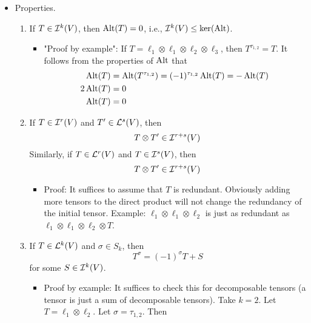 \documentclass[../notes.tex]{subfiles}
\begin{document}
\begin{itemize}
\begin{itemize}
    \end{itemize}
    \item Properties.
    \begin{enumerate}
        \item If $T\in\ide[k]{V}$, then $\Alt(T)=0$, i.e., $\ide[k]{V}\leq\ker(\Alt)$.
        \begin{itemize}
            \item "Proof by example": If $T=\ell_1\otimes\ell_1\otimes\ell_2\otimes\ell_3$, then $T^{\tau_{1,2}}=T$. It follows from the properties of $\Alt$ that
            \begin{align*}
                \Alt(T) &= \Alt(T^{\tau_{1,2}})
                = (-1)^{\tau_{1,2}}\Alt(T)
                = -\Alt(T)\\
                2\Alt(T) &= 0\\
                \Alt(T) &= 0
            \end{align*}
        \end{itemize}
        \item If $T\in\ide[r]{V}$ and $T'\in\lin[s]{V}$, then
        \begin{equation*}
            T\otimes T'\in\ide[r+s]{V}
        \end{equation*}
        Similarly, if $T\in\lin[r]{V}$ and $T\in\ide[s]{V}$, then
        \begin{equation*}
            T\otimes T'\in\ide[r+s]{V}
        \end{equation*}
        \begin{itemize}
            \item Proof: It suffices to assume that $T$ is redundant. Obviously adding more tensors to the direct product will not change the redundancy of the initial tensor. Example: $\ell_1\otimes\ell_1\otimes\ell_2$ is just as redundant as $\ell_1\otimes\ell_1\otimes\ell_2\otimes T$.
        \end{itemize}
        \item If $T\in\lin[k]{V}$ and $\sigma\in S_k$, then
        \begin{equation*}
            T^\sigma = (-1)^\sigma T+S
        \end{equation*}
        for some $S\in\ide[k]{V}$.
        \begin{itemize}
            \item Proof by example: It suffices to check this for decomposable tensors (a tensor is just a sum of decomposable tensors). Take $k=2$. Let $T=\ell_1\otimes\ell_2$. Let $\sigma=\tau_{1,2}$. Then

\end{itemize}
\end{enumerate}
\end{itemize}
\end{document}
